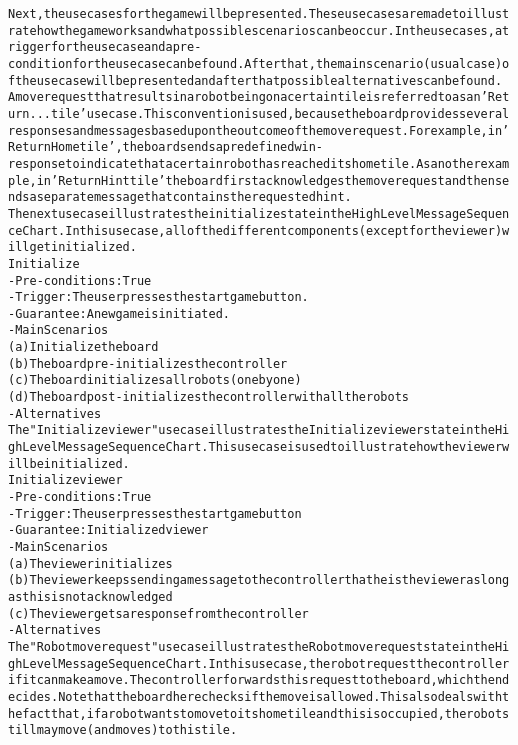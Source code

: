 \begin{alltt}
\rm
Next, the use cases for the game will be presented. These use cases are made to illustrate how the game works and what possible scenarios can be occur. In the use cases, a trigger for the use case and a pre-condition for the use case can be found. After that, the main scenario (usual case) of the use case will be presented and after that possible alternatives can be found. \\
A move request that results in a robot being on a certain tile is referred to as an 'Return ... tile' use case. This convention is used, because the board provides several responses and messages based upon the outcome of the move request. For example, in 'Return Home tile', the board sends a predefined win-response to indicate that a certain robot has reached its home tile. As another example, in 'Return Hint tile' the board first acknowledges the move request and then sends a separate message that contains the requested hint. \\

The next use case illustrates the initialize state in the High Level Message Sequence Chart. In this use case, all of the different components (except for the viewer) will get initialized. \\

Initialize
- Pre-conditions: True
- Trigger: The user presses the start game button.
- Guarantee: A new game is initiated.
- Main Scenarios
    (a) Initialize the board
    (b) The board pre-initializes the controller
    (c) The board initializes all robots (one by one)
    (d) The board post-initializes the controller with all the robots
- Alternatives \\

The "Initialize viewer" use case illustrates the Initialize viewer state in the High Level Message Sequence Chart. This use case is used to illustrate how the viewer will be initialized. \\

Initialize viewer
- Pre-conditions: True
- Trigger: The user presses the start game button
- Guarantee: Initialized viewer
- Main Scenarios
    (a) The viewer initializes
    (b) The viewer keeps sending a message to the controller that he is the viewer as long as this is not acknowledged
    (c) The viewer gets a response from the controller
- Alternatives \\

The "Robot move request" use case illustrates the Robot move request state in the High Level Message Sequence Chart. In this use case, the robot request the controller if it can make a move. The controller forwards this request to the board, which then decides. Note that the board here checks if the move is allowed. This also deals with the fact that, if a robot wants to move to its home tile and this is occupied, the robot still may move (and moves) to this tile. \\


\end{alltt}
